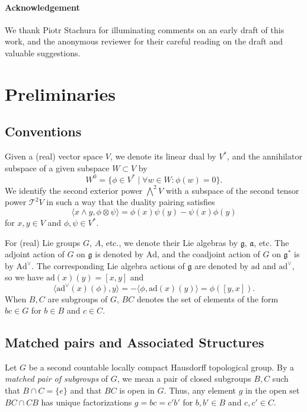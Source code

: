 \documentclass[a4paper,11pt]{amsart}
\newcommand{\fr}[1]{\mathfrak{#1}}
\newcommand{\Ad}{\mathrm{Ad}}
\newcommand{\ad}{\mathrm{ad}}
\newcommand{\medwedge}{{\textstyle\bigwedge}}
\theoremstyle{definition}
\theoremstyle{remark}
\begin{document}
\paragraph{Acknowledgement}
We thank Piotr Stachura for illuminating comments on an early draft of this work, and the anonymous reviewer for their careful reading on the draft and valuable suggestions.

\section{Preliminaries}
\label{sec:prelim}

\subsection{Conventions}

Given a (real) vector space $V$, we denote its linear dual by $V^*$, and the annihilator subspace of a given subspace $W \subset V$ by
\[
W^0 = \{ \phi \in V^* \mid \forall w \in W \colon \phi(w) = 0 \}.
\]
We identify the second exterior power $\medwedge^2 V$ with a subspace of the second tensor power  $\mathcal{T}^2 V$ in such a way that the duality pairing satisfies
\[
\langle x \wedge y, \phi \otimes \psi \rangle = \phi(x) \psi(y) - \psi(x) \phi(y)
\]
for $x, y \in V$ and $\phi, \psi \in V^*$.

For  (real) Lie groups $G$, $A$, etc., we denote their Lie algebras by $\fr{g}$, $\fr{a}$, etc.
The adjoint action of $G$ on $\fr{g}$ is denoted by $\Ad$, and the coadjoint action of $G$ on $\fr{g}^*$ is by $\Ad^\vee$.
The corresponding Lie algebra actions of $\fr g$ are denoted by $\ad$ and $\ad^\vee$, so we have $\ad(x)(y) = [x, y]$ and
\[
\langle \ad^\vee(x)(\phi), y \rangle = - \langle \phi, \ad(x)(y) \rangle = \phi([y,x]).
\]
When $B, C$ are subgroups of $G$, $B C$ denotes the set of elements of the form $b c \in G$ for $b \in B$ and $c \in C$.


\subsection{Matched pairs and Associated Structures}

Let $G$ be a second countable locally compact Hausdorff topological group.
By a \emph{matched pair of subgroups} of $G$, we mean a pair of closed subgroups $B, C$ such that $B \cap C = \{ e \}$ and that $B C$ is open in $G$.
Thus, any element $g$ in the open set $B C \cap C B$ has unique factorizations $g = b c = c' b'$ for $b, b' \in B$ and $c, c' \in C$.
\end{document}
